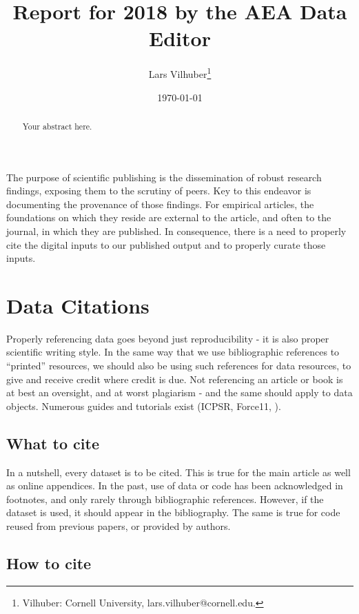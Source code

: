 \documentclass[AEJ]{AEA}
\begin{document}
\title{Report for 2018 by the AEA Data Editor }
\author{Lars Vilhuber\thanks{%
Vilhuber: Cornell University, lars.vilhuber@cornell.edu.}}
\date{\today}
\JEL{}
\Keywords{}

\begin{abstract}
Your abstract here.
\end{abstract}

\maketitle
The purpose of scientific publishing is the dissemination of robust research findings, exposing them to the scrutiny of peers. Key to this endeavor is documenting the provenance of those findings. For empirical articles, the foundations on which they reside are external to the article, and often to the journal, in which they are published.  In consequence, there is a need to properly cite the digital inputs to our published output and to properly curate those inputs.  


\section{Data Citations}
Properly referencing data goes beyond just reproducibility - it is also proper scientific writing style. In the same way that we use bibliographic references to ``printed'' resources, we should also be using such references for data resources, to give and receive credit where credit is due. Not referencing an article or book is at best an oversight, and at worst plagiarism - and the same should apply to data objects. Numerous guides and tutorials exist (ICPSR, Force11, \cite{dataone-l09}).

\subsection{What to cite}

In a nutshell, every dataset is to be cited. This is true for the main article as well as online appendices. In the past, use of data or code has been acknowledged in footnotes, and only rarely through bibliographic references. However,  if the dataset is used, it should appear in the bibliography. The same is true for code reused from previous papers, or provided by authors. 

\subsection{How to cite}
\end{document}
